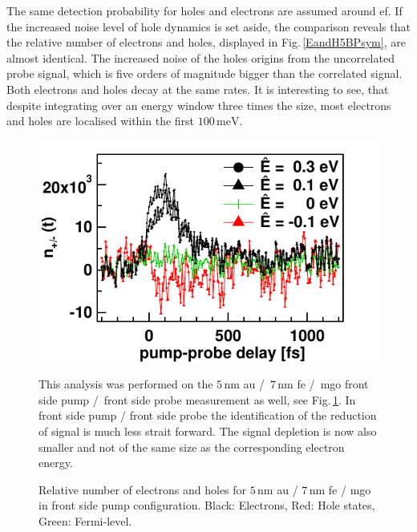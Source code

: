 \documentclass[a4paper,12pt,twoside]{article}
\begin{document}
 The same detection probability for holes and electrons are assumed around \gls{ef}. If the increased noise level of hole dynamics is set  aside, the comparison reveals that the relative number of electrons and holes, displayed in Fig.\,\ref{EandH5BPsym}, are almost identical.
The increased noise of the holes origins from the uncorrelated probe signal, which is five orders of magnitude bigger than the correlated signal. Both electrons and holes decay at the same rates. It is interesting to see, that despite integrating over an energy window three times the size, most electrons and holes are localised within the first $100\,\mathrm{meV}$.
    	\begin{figure}[H]
		\begin{minipage}[t]{.55\linewidth}
			\includegraphics[width=\linewidth]{figures/relativnumberFP.pdf}
			\caption{Relative number of electrons and holes for $5\,\mathrm{nm}$ \gls{au} / $7\,\mathrm{nm}$ \gls{fe} / \gls{mgo} in front side pump configuration. Black: Electrons, Red: Hole states, Green: Fermi-level.}
			\label{relativeFP}
		\end{minipage}
		\hspace{.075\linewidth}
		\begin{minipage}{.375\linewidth}
		 This analysis was performed on the $5\,\mathrm{nm}$ \gls{au} /\, $7\,\mathrm{nm}$ \gls{fe} /\, \gls{mgo} front side pump /\, front side probe measurement as well, see Fig.\,\ref{relativeFP}. In front side pump / front side probe the identification of the reduction of signal is much less strait forward. The signal depletion is now also smaller and not of the same size as the corresponding electron energy.
		\end{minipage}
		\end{figure}
\end{document}

